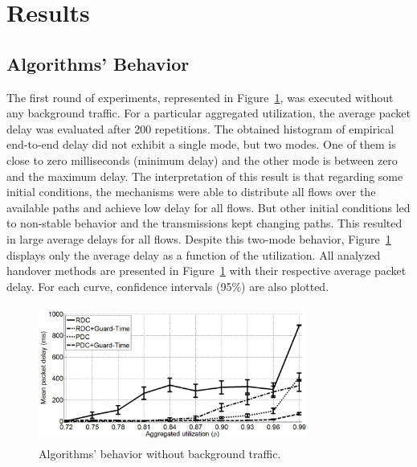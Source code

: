 \documentclass[letterpaper,10pt,oneside,conference,final]{sbrt2015}
\begin{document}
\section{Results}
\subsection{Algorithms' Behavior}
The first round of experiments, represented in Figure~\ref{figura2}, was executed without any background traffic. For a particular aggregated utilization, the average packet delay was evaluated after 200 repetitions. The obtained histogram of empirical end-to-end delay did not exhibit a single mode, but two modes. One of them is close to zero milliseconds (minimum delay) and the other mode is between zero and the maximum delay. The interpretation of this result is that regarding some initial conditions, the mechanisms were able to distribute all flows over the available paths and achieve low delay for all flows. But other initial conditions led to non-stable behavior and the transmissions kept changing paths. This resulted in large average delays for all flows. Despite this two-mode behavior, Figure~\ref{figura2} displays only the average delay as a function of the utilization. All analyzed handover methods are presented in Figure~\ref{figura2} with their respective average packet delay. For each curve, confidence intervals (95\%) are also plotted.

\begin{figure}[h!]
\centering
\includegraphics[width=8.8cm,height=4.5cm]{figura2}
\caption{Algorithms' behavior without background traffic.}
\label{figura2}
\end{figure}
\end{document}
